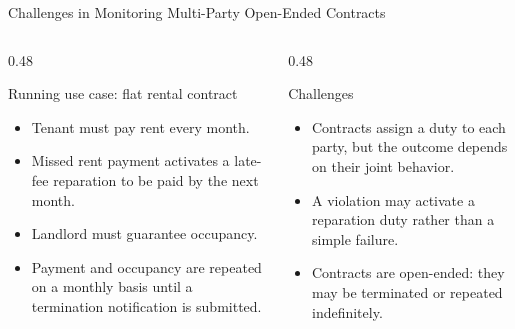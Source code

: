 \documentclass[9pt,aspectratio=169]{beamer}
\begin{document}
\begin{frame}{Challenges in Monitoring Multi-Party Open-Ended Contracts}
\small
\begin{columns}[T,totalwidth=\textwidth]
    \begin{column}{0.48\textwidth}
  \begin{block}{Running use case: flat rental contract}
    \begin{itemize}
      \item Tenant must pay rent every month.
      \item Missed rent payment activates a late-fee reparation to be paid by the next month.
      \item Landlord must guarantee occupancy.
      \item Payment and occupancy are repeated on a monthly basis until a termination notification is submitted.
    \end{itemize}
  \end{block}
\end{column}
  \begin{column}{0.48\textwidth}
    \begin{block}{Challenges}
      \begin{itemize}
        \item Contracts assign a duty to each party, but the outcome depends on their joint behavior.
        \item A violation may activate a reparation duty rather than a simple failure.
        \item Contracts are open-ended: they may be terminated or repeated indefinitely.
      \end{itemize}
    \end{block}
  \end{column}


\end{columns}

\end{frame}
\end{document}

